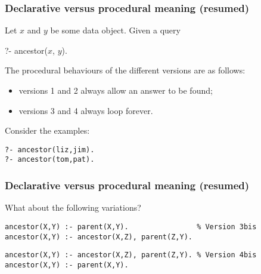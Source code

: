 %
\begin{frame}[containsverbatim]
\frametitle{Declarative versus procedural meaning (resumed)}

Let \(x\) and \(y\) be some data object. Given a query
{\small
\begin{semiverbatim}
?- ancestor(\(x\), \(y\)).
\end{semiverbatim}
}
The procedural behaviours of the different versions are as follows:
\begin{itemize}

  \item versions 1 and 2 always allow an answer to be found;

  \item versions 3 and 4 always loop forever.
\end{itemize}
Consider the examples:
{\small
\begin{verbatim}
?- ancestor(liz,jim).
?- ancestor(tom,pat).
\end{verbatim}
}

\end{frame}

%
\begin{frame}[containsverbatim]
\frametitle{Declarative versus procedural meaning (resumed)}

What about the following variations?
{\small
\begin{verbatim}
ancestor(X,Y) :- parent(X,Y).                % Version 3bis
ancestor(X,Y) :- ancestor(X,Z), parent(Z,Y).
\end{verbatim}
}
{\small
\begin{verbatim}
ancestor(X,Y) :- ancestor(X,Z), parent(Z,Y). % Version 4bis
ancestor(X,Y) :- parent(X,Y).
\end{verbatim}
}

\end{frame}
